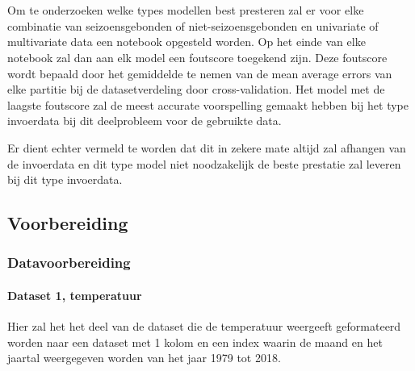 \chapter{}
\label{ch:methodologie}

Om te onderzoeken welke types modellen best presteren zal er voor elke combinatie van seizoensgebonden of niet-seizoensgebonden en univariate of multivariate data een notebook opgesteld worden. Op het einde van elke notebook zal dan aan elk model een foutscore toegekend zijn. Deze foutscore wordt bepaald door het gemiddelde te nemen van de mean average errors van elke partitie bij de datasetverdeling door cross-validation. Het model met de laagste foutscore zal de meest accurate voorspelling gemaakt hebben bij het type invoerdata bij dit deelprobleem voor de gebruikte data. 

Er dient echter vermeld te worden dat dit in zekere mate altijd zal afhangen van de invoerdata en dit type model niet noodzakelijk de beste prestatie zal leveren bij dit type invoerdata.

\section{Voorbereiding}
\subsection{Datavoorbereiding}
\subsubsection{Dataset 1, temperatuur}
Hier zal het het deel van de dataset die de temperatuur weergeeft geformateerd worden  naar een dataset met 1 kolom en een index waarin de maand en het jaartal weergegeven worden van het jaar 1979 tot 2018.

